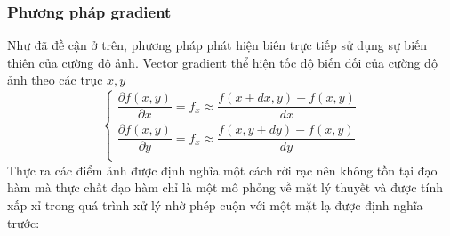 \documentclass[12pt, oneside, a4]{book}
\begin{document}
\subsubsection{Phương pháp gradient}
Như đã đề cận ở trên, phương pháp phát hiện biên trực tiếp sử dụng sự biến thiên của cường độ ảnh. Vector gradient thể hiện tốc độ biến đối của cường độ ảnh theo các trục $x,y$ 
\begin{equation*}
\begin{cases}
 \dfrac{\partial f(x,y)}{\partial x}=f_x\approx\dfrac{f(x+dx,y)-f(x,y)}{dx}\\
 \dfrac{\partial f(x,y)}{\partial y}=f_x\approx\dfrac{f(x,y+dy)-f(x,y)}{dy}\\
   \end{cases}
\end{equation*}
Thực ra các điểm ảnh được định nghĩa một cách rời rạc nên không tồn tại đạo hàm mà thực chất đạo hàm chỉ là một mô phỏng về mặt lý thuyết và được tính xấp xỉ trong quá trình xử lý nhờ phép cuộn với một mặt lạ được định nghĩa trước:
\end{document}
